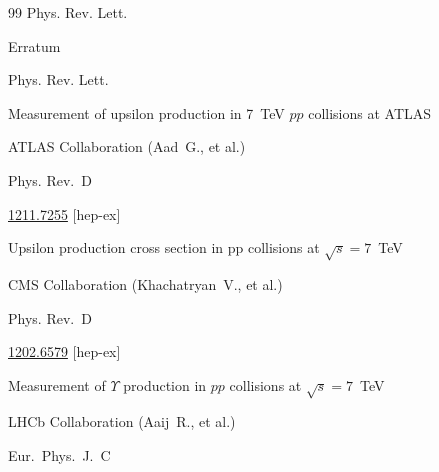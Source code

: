 \begin{thebibliography}{99}
\jour Phys. Rev.  Lett.





\moreref

\paper Erratum 

\jour Phys. Rev. Lett.









\paper Measurement of upsilon production in 7~TeV $pp$ collisions at ATLAS

\by ATLAS Collaboration (Aad~G., et al.)

\jour Phys. Rev.~D 





\arxiv \href{http://arxiv.org/abs/1211.7255}{1211.7255} [hep-ex]




\paper Upsilon production cross section in pp collisions at $\sqrt s =7$~TeV

\by CMS Collaboration (Khachatryan~V., et al.)

\jour Phys. Rev.~D 








\arxiv \href{http://arxiv.org/abs/1202.6579}{1202.6579} [hep-ex]

\paper Measurement of $\Upsilon$ production in $pp$ collisions at ${\sqrt s =7}$~TeV

\by  LHCb Collaboration (Aaij~R., et al.)

\jour Eur.~Phys.~J.~C 



\end{thebibliography}
